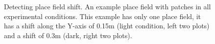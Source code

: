 \begin{figure}
\captionsetup{format=plain}
\caption[Field shift detection]{
Detecting place field shift. An example place field with patches in all experimental conditions. This example has only one place field, it has a shift along the Y-axis of 0.15m (light condition, left two plots) and a shift of 0.3m (dark, right two plots).
}
\label{fig:F36_shift_detection}
\end{figure}
